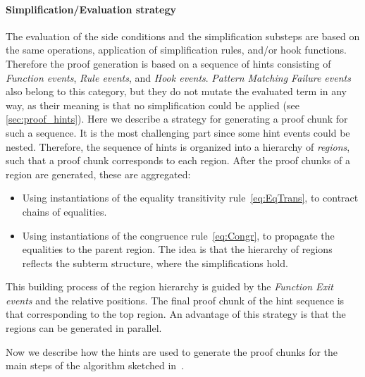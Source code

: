 \documentclass{article}
\theoremstyle{plain}
\theoremstyle{definition}
\begin{document}
\paragraph{Simplification/Evaluation strategy\\} 
The evaluation of the side conditions and the simplification substeps are based on the same operations, application of simplification rules, and/or hook functions. Therefore the proof generation is based on a sequence of hints consisting of \textit{Function events}, \textit{Rule events}, and \textit{Hook events}. \textit{Pattern Matching Failure events} also belong to this category, but they do not mutate the evaluated term in any way, as their meaning is that no simplification could be applied (see \cref{sec:proof_hints}). Here we describe a strategy for generating a
proof chunk for such a sequence. It is the most challenging part since some hint events could be nested. Therefore, the sequence of hints is organized into a hierarchy of \emph{regions}, such that a proof chunk corresponds to each region. After the proof chunks of a region are generated, these are aggregated:
\begin{itemize}
\item Using instantiations of the equality transitivity rule~\eqref{eq:EqTrans}, to contract chains of equalities.
\item Using instantiations of the congruence rule~\eqref{eq:Congr}, to propagate the equalities to the parent region. The idea is that the hierarchy of regions reflects the subterm structure, where the simplifications hold.
\end{itemize}
This building process of the region hierarchy is guided by the \textit{Function Exit events} and the relative positions.
The final proof chunk of the hint sequence is that corresponding to the top region. An advantage of this strategy is that the regions can be generated in parallel.

Now we describe how the hints are used to generate the proof chunks for the main steps of the algorithm sketched in~.
\end{document}
